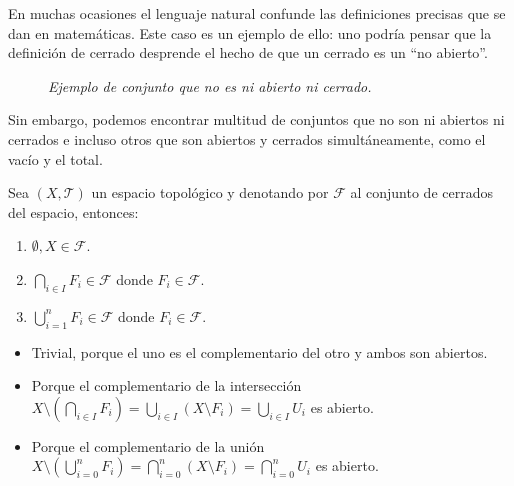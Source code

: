 \begin{obs}
En muchas ocasiones el lenguaje natural confunde las definiciones precisas que se dan en matemáticas. Este caso es un ejemplo de ello: uno podría pensar que la definición de cerrado desprende el hecho de que un cerrado es un ``no abierto''.
\begin{figure}[H]
    \centering
    \caption{\textit{Ejemplo de conjunto que no es ni abierto ni cerrado.}}
    \label{fig:observación-abiertos-y-cerrados.}
\end{figure}
Sin embargo, podemos encontrar multitud de conjuntos que no son ni abiertos ni cerrados e incluso otros que son abiertos y cerrados simultáneamente, como el vacío y el total.
\end{obs}

\begin{prop}
Sea $(X,\mathcal{T})$ un espacio topológico y denotando por $\mathcal{F}$ al conjunto de cerrados del espacio, entonces:
\begin{enumerate}
    \item $\emptyset, X \in \mathcal{F}$.
    \item $\bigcap_{i \in I} F_i \in \mathcal{F}$ donde $F_i \in \mathcal{F}$.
    \item $\bigcup_{i=1}^n F_i \in \mathcal{F}$ donde $F_i \in \mathcal{F}$.
\end{enumerate}
\end{prop}
\begin{demo}
\begin{itemize}
\item Trivial, porque el uno es el complementario del otro y ambos son abiertos.

\item Porque el complementario de la intersección $X\setminus \left(\bigcap_{i \in I} F_i \right) = \bigcup_{i \in I} \left( X \setminus F_i \right) = \bigcup_{i \in I} U_i$ es abierto.

\item Porque el complementario de la unión $X\setminus \left(\bigcup_{i = 0}^n F_i\right) = \bigcap_{i=0}^n \left( X \setminus F_i\right) = \bigcap_{i=0}^n U_i$ es abierto.
\end{itemize}
\end{demo}

